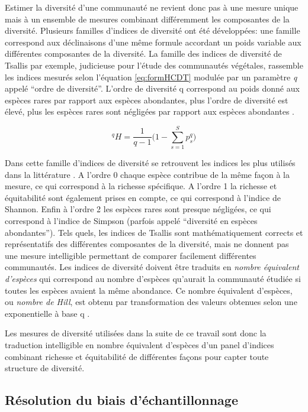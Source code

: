 \documentclass[
  11pt,
  french,
  A4paper,
  extrafontsizes,onecolumn,openright
  ]{memoir}
\begin{document}
Estimer la diversité d'une communauté ne revient donc pas à une mesure
unique mais à un ensemble de mesures combinant différemment les
composantes de la diversité. Plusieurs familles d'indices de diversité
ont été développées: une famille correspond aux déclinaisons d'une même
formule accordant un poids variable aux différentes composantes de la
diversité. La famille des indices de diversité de Tsallis par exemple,
judicieuse pour l'étude des communautés végétales, rassemble les indices
mesurés selon l'équation \eqref{eq:formHCDT} modulée par un paramètre
\emph{q} appelé ``ordre de diversité''. L'ordre de diversité q
correspond au poids donné aux espèces rares par rapport aux espèces
abondantes, plus l'ordre de diversité est élevé, plus les espèces rares
sont négligées par rapport aux espèces abondantes \autocite{Mendes2008}.

\begin{equation}
{^{q}H=\frac{1}{q-1}\Bigg(1-\displaystyle\sum_{s=1}^{S}p^q_s\Bigg) }
\label{eq:formHCDT}
\end{equation}

Dans cette famille d'indices de diversité se retrouvent les indices les
plus utilisés dans la littérature
\autocites{Shannon1948}{Simpson1949}{Patil1982}{Tothmeresz1995}. A
l'ordre 0 chaque espèce contribue de la même façon à la mesure, ce qui
correspond à la richesse spécifique. A l'ordre 1 la richesse et
équitabilité sont également prises en compte, ce qui correspond à
l'indice de Shannon. Enfin à l'ordre 2 les espèces rares sont presque
négligées, ce qui correspond à l'indice de Simpson (parfois appelé
``diversité en espèces abondantes''). Tels quels, les indices de Tsallis
sont mathématiquement corrects et représentatifs des différentes
composantes de la diversité, mais ne donnent pas une mesure intelligible
permettant de comparer facilement différentes communautés. Les indices
de diversité doivent être traduits en \emph{nombre équivalent d'espèces}
qui correspond au nombre d'espèces qu'aurait la communauté étudiée si
toutes les espèces avaient la même abondance. Ce nombre équivalent
d'espèces, ou \emph{nombre de Hill}, est obtenu par transformation des
valeurs obtenues selon une exponentielle à base q \autocite{Hill1973}.

Les mesures de diversité utilisées dans la suite de ce travail sont donc
la traduction intelligible en nombre équivalent d'espèces d'un panel
d'indices combinant richesse et équitabilité de différentes façons pour
capter toute structure de diversité.

\subsection{Résolution du biais
d'échantillonnage}\label{resolution-du-biais-dechantillonnage}
\end{document}
